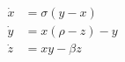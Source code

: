 \documentclass[preview]{standalone}
\begin{document}
\begin{align*}
\dot{x} &= \sigma (y-x) \\
\dot{y} &= x(\rho -z)-y \\
\dot{z} &= xy-\beta z
\end{align*}
\end{document}
